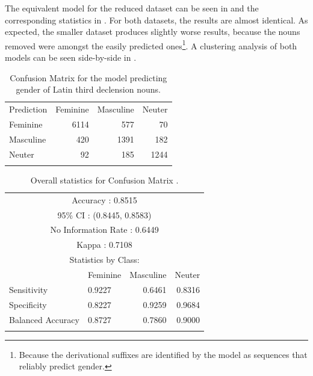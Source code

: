 The equivalent model for the reduced dataset can be seen in  and the corresponding statistics in . For both datasets, the results are almost identical. As expected, the smaller dataset produces slightly worse results, because the nouns removed were amongst the easily predicted ones\footnote{Because the derivational suffixes are identified by the model as sequences that reliably predict gender.}. A clustering analysis of both models can be seen side-by-side in .

\begin{table}[!htpb]
  \centering
  \begin{tabular}{lrrr}
    \lsptoprule
    \multicolumn{4}{c}{Reference}              \\
    \midrule
    Prediction & Feminine & Masculine & Neuter \\
    Feminine   & 6114     & 577       & 70     \\
    Masculine  & 420      & 1391      & 182    \\
    Neuter     & 92       & 185       & 1244   \\
    \lspbottomrule
  \end{tabular}
  \caption{Confusion Matrix for the model predicting gender of Latin third declension nouns.}\label{tab:gender-lat-2}
\end{table}

\begin{table}[!htpb]
  \centering
  \begin{tabular}{llrr}
    \lsptoprule
    \multicolumn{4}{c}{Overall statistics:} \\

    \midrule
    \multicolumn{4}{c}{Accuracy : 0.8515}             \\
    \multicolumn{4}{c}{95\% CI : (0.8445, 0.8583)}    \\
    \multicolumn{4}{c}{No Information Rate : 0.6449}  \\
    \multicolumn{4}{c}{Kappa : 0.7108}                \\
    \midrule
    \multicolumn{4}{c}{Statistics by Class:}          \\
    \midrule
                      & Feminine & Masculine & Neuter \\
    Sensitivity       & 0.9227   & 0.6461    & 0.8316 \\
    Specificity       & 0.8227   & 0.9259    & 0.9684 \\
    Balanced Accuracy & 0.8727   & 0.7860    & 0.9000 \\
    \lspbottomrule
  \end{tabular}
  \caption{Overall statistics for Confusion Matrix .}\label{tab:gender-lat-stats-2}
\end{table}

